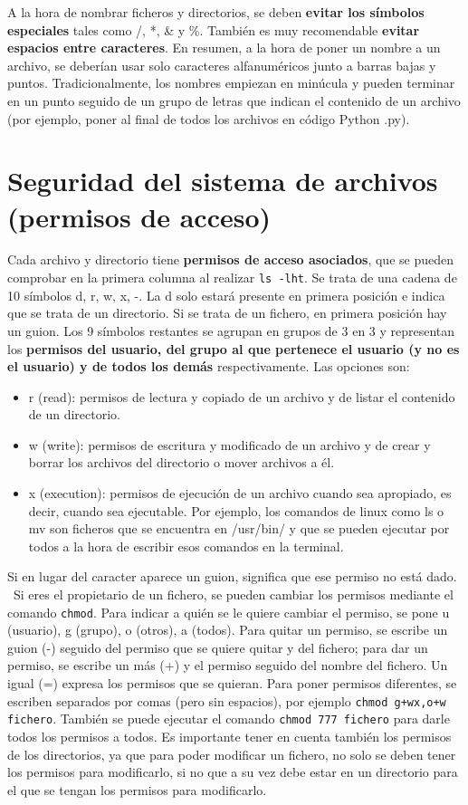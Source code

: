 A la hora de nombrar ficheros y directorios, se deben \textbf{evitar los símbolos especiales} tales como /, *, \& y \%. También es muy recomendable \textbf{evitar espacios entre caracteres}. En resumen, a la hora de poner un nombre a un archivo, se deberían usar solo caracteres alfanuméricos junto a barras bajas y puntos. Tradicionalmente, los nombres empiezan en minúcula y pueden terminar en un punto seguido de un grupo de letras que indican el contenido de un archivo (por ejemplo, poner al final de todos los archivos en código Python .py).

\section{Seguridad del sistema de archivos (permisos de acceso)}
Cada archivo y directorio tiene \textbf{permisos de acceso asociados}, que se pueden comprobar en la primera columna al realizar \texttt{ls -lht}. Se trata de una cadena de 10 símbolos d, r, w, x, -. La d solo estará presente en primera posición e indica que se trata de un directorio. Si se trata de un fichero, en primera posición hay un guion. Los 9 símbolos restantes se agrupan en grupos de 3 en 3 y representan los \textbf{permisos del usuario, del grupo al que pertenece el usuario (y no es el usuario) y de todos los demás} respectivamente. Las opciones son:
\begin{itemize}
\item r (read): permisos de lectura y copiado de un archivo y de listar el contenido de un directorio.
\item w (write): permisos de escritura y modificado de un archivo y de crear y borrar los archivos del directorio o mover archivos a él.
\item x (execution): permisos de ejecución de un archivo cuando sea apropiado, es decir, cuando sea ejecutable. Por ejemplo, los comandos de linux como ls o mv son ficheros que se encuentra en /usr/bin/ y que se pueden ejecutar por todos a la hora de escribir esos comandos en la terminal. 
\end{itemize}
Si en lugar del caracter aparece un guion, significa que ese permiso no está dado.  \ Si eres el propietario de un fichero, se pueden cambiar los permisos mediante el comando \texttt{chmod}. Para indicar a quién se le quiere cambiar el permiso, se pone u (usuario), g (grupo), o (otros), a (todos). Para quitar un permiso, se escribe un guion (-) seguido del permiso que se quiere quitar y del fichero; para dar un permiso, se escribe un más (+) y el permiso seguido del nombre del fichero. Un igual (=) expresa los permisos que se quieran. Para poner permisos diferentes, se escriben separados por comas (pero sin espacios), por ejemplo \texttt{chmod g+wx,o+w fichero}. También se puede ejecutar el comando \texttt{chmod 777 fichero} para darle todos los permisos a todos. Es importante tener en cuenta también los permisos de los directorios, ya que para poder modificar un fichero, no solo se deben tener los permisos para modificarlo, si no que a su vez debe estar en un directorio para el que se tengan los permisos para modificarlo.


